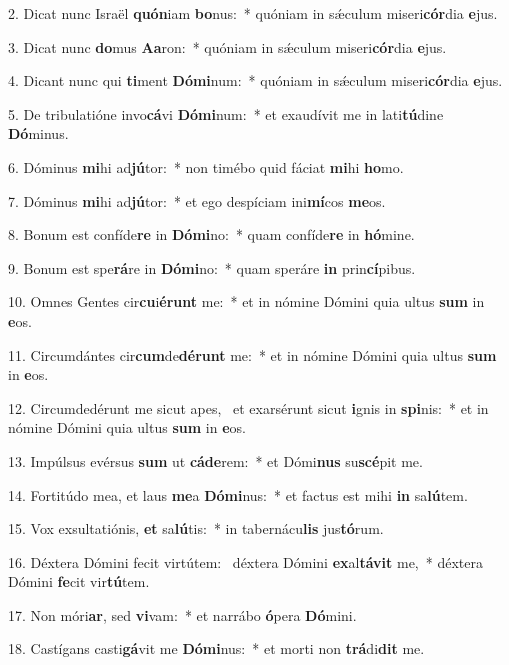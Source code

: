 2. Dicat nunc Israël \textbf{quón}iam \textbf{bo}nus:~*  quóniam in sǽculum miseri\textbf{cór}dia \textbf{e}jus.\

3. Dicat nunc \textbf{do}mus \textbf{A}\textbf{a}ron:~*  quóniam in sǽculum miseri\textbf{cór}dia \textbf{e}jus.\

4. Dicant nunc qui \textbf{ti}ment \textbf{Dó}\textbf{mi}num:~*  quóniam in sǽculum miseri\textbf{cór}dia \textbf{e}jus.\

5. De tribulatióne invo\textbf{cá}vi \textbf{Dó}\textbf{mi}num:~*  et exaudívit me in lati\textbf{tú}dine \textbf{Dó}minus.\

6. Dóminus \textbf{mi}hi ad\textbf{jú}tor:~*  non timébo quid fáciat \textbf{mi}hi \textbf{ho}mo.\

7. Dóminus \textbf{mi}hi ad\textbf{jú}tor:~*  et ego despíciam ini\textbf{mí}cos \textbf{me}os.\

8. Bonum est confíde\textbf{re} in \textbf{Dó}\textbf{mi}no:~*  quam confíde\textbf{re} in \textbf{hó}mine.\

9. Bonum est spe\textbf{rá}re in \textbf{Dó}\textbf{mi}no:~*  quam speráre \textbf{in} prin\textbf{cí}pibus.\

10. Omnes Gentes cir\textbf{cu}i\textbf{é}\textbf{runt} me:~*  et in nómine Dómini quia ultus \textbf{sum} in \textbf{e}os.\

11. Circumdántes cir\textbf{cum}de\textbf{dé}\textbf{runt} me:~*  et in nómine Dómini quia ultus \textbf{sum} in \textbf{e}os.\

12. Circumdedérunt me sicut apes, \dag\  et exarsérunt sicut \textbf{i}gnis in \textbf{spi}nis:~*  et in nómine Dómini quia ultus \textbf{sum} in \textbf{e}os.\

13. Impúlsus evérsus \textbf{sum} ut \textbf{cá}\textbf{de}rem:~*  et Dómi\textbf{nus} su\textbf{scé}pit me.\

14. Fortitúdo mea, et laus \textbf{me}a \textbf{Dó}\textbf{mi}nus:~*  et factus est mihi \textbf{in} sa\textbf{lú}tem.\

15. Vox exsultatiónis, \textbf{et} sa\textbf{lú}tis:~*  in tabernácu\textbf{lis} jus\textbf{tó}rum.\

16. Déxtera Dómini fecit virtútem: \dag\  déxtera Dómini \textbf{ex}al\textbf{tá}\textbf{vit} me,~*  déxtera Dómini \textbf{fe}cit vir\textbf{tú}tem.\

17. Non móri\textbf{ar}, sed \textbf{vi}vam:~*  et narrábo \textbf{ó}pera \textbf{Dó}mini.\

18. Castígans casti\textbf{gá}vit me \textbf{Dó}\textbf{mi}nus:~*  et morti non \textbf{trá}di\textbf{dit} me.\

